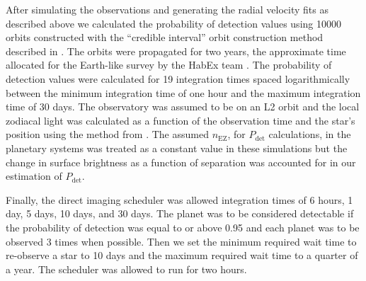 After simulating the observations and generating the radial velocity fits as
described above we calculated the probability of detection values using 10000
orbits constructed with the ``credible interval'' orbit construction method
described in . The orbits were propagated for two years,
the approximate time allocated for the Earth-like survey by the HabEx team
\citep{gaudiHabitableExoplanetObservatory2020}. The probability of detection
values were calculated for 19 integration times spaced logarithmically between
the minimum integration time of one hour and the maximum integration time of 30
days. The observatory was assumed to be on an L2 orbit and the local zodiacal light
was calculated as a function of the observation time and the star's position using
the method from .
The assumed $n_\textrm{EZ}$, for $P_\textrm{det}$ calculations, in the
planetary systems was treated as a constant value in these simulations but the
change in surface brightness as a function of separation was accounted for in
our estimation of $P_\textrm{det}$.

Finally, the direct imaging scheduler was allowed integration times of 6 hours,
1 day, 5 days, 10 days, and 30 days. The planet was to be considered detectable
if the probability of detection was equal to or above 0.95 and each planet was
to be observed 3 times when possible. Then we set the minimum required wait
time to re-observe a star to 10 days and the maximum required wait time to a
quarter of a year. The scheduler was allowed to run for two hours.

